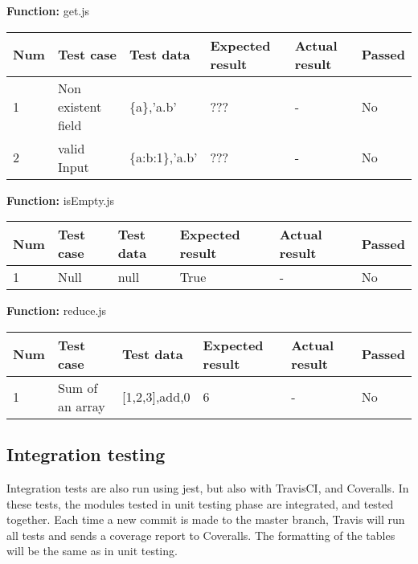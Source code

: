 \documentclass[a4paper, 12pt]{article}
\begin{document}
\newpage
    
        \textbf{Function:} get.js
        
        \begin{table}[h!]
           \begin{tabular}{|l|p{3cm}|p{2cm}|p{2cm}|p{2.5cm}|l|}
                \hline
                Num & Test case        					& Test data 					& Expected result 					& Actual result 		& Passed \\ \hline
                1   & Non  existent field 				& \{a\},'a.b'     				& ???               				& -             		& No     \\ \hline
                2   & valid Input 						& \{a:b:1\},'a.b'     			& ???               				& -             		& No     \\ \hline
            \end{tabular}
        \end{table}

        \textbf{Function:} isEmpty.js
        
        \begin{table}[h!]
           \begin{tabular}{|l|p{3cm}|p{2cm}|p{2cm}|p{2.5cm}|l|}
                \hline
                Num & Test case         						& Test data 					& Expected result 					& Actual result 		& Passed \\ \hline
                1   & Null 										& null     						& True                				& -             		& No     \\ \hline
            \end{tabular}
        \end{table}
    
        \textbf{Function:} reduce.js
        
        \begin{table}[h!]
           \begin{tabular}{|l|p{3cm}|p{2cm}|p{2cm}|p{2.5cm}|l|}
                \hline
                Num & Test case        					& Test data 					& Expected result 					& Actual result 		& Passed \\ \hline
                1   & Sum of an array 					& {[}1,2,3{]},add,0     		& 6                					& -             		& No     \\ \hline
            \end{tabular}
        \end{table}
\newpage
    \subsection{Integration testing}
        Integration tests are also run using jest, but also with TravisCI, and Coveralls. In these tests, the modules tested in unit testing phase are integrated, and tested together. Each time a new commit is made to the master branch, Travis will run all tests and sends a coverage report to Coveralls. The formatting of the tables will be the same as in unit testing. 
\end{document}
